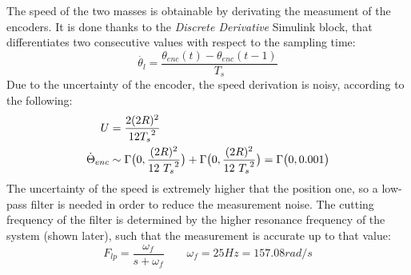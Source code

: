 The speed of the two masses is obtainable by derivating the measument of the encoders. It is done thanks to the \textit{Discrete Derivative} Simulink block, that differentiates two consecutive values with respect to the sampling time:
\[
	\dot{\theta_l} = \frac{ \theta_{enc}(t) - \theta_{enc}(t-1)}{T_s}
\]
Due to the uncertainty of the encoder, the speed derivation is noisy, according to the following:
\begin{align*}
	U &= \frac{2(2R)^2}{12 {T_s}^2 } \\
	\dot{\Theta}_{enc}	&\sim \Gamma \bigl{(} 0,\frac{(2R)^2}{12 \ {T_s}^2} \bigr{)} + \Gamma \bigl{(} 0,\frac{(2R)^2}{12 \ {T_s}^2} \bigr{)} = \Gamma \bigl{(} 0, 0.001 \bigr{)}
\end{align*}
The uncertainty of the speed is extremely higher that the position one, so a low-pass filter is needed in order to reduce the measurement noise. The cutting frequency of the filter is determined by the higher resonance frequency of the system (shown later), such that the measurement is accurate up to that value:
\[
	F_{lp} = \frac{ \omega_f }{ s+\omega_f} \qquad \omega_f=25Hz=157.08 rad/s
\]